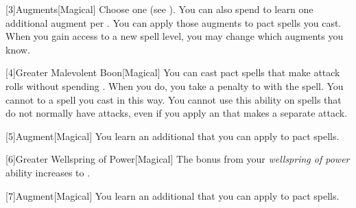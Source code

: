         [3]{Augments}[Magical]
        Choose one  (see ).
        You can also spend  to learn one additional augment per .
        You can apply those augments to pact spells you cast.
        When you gain access to a new spell level, you may change which augments you know.

        [4]{Greater Malevolent Boon}[Magical] You can cast pact spells that make attack rolls without spending .
        When you do, you take a  penalty to  with the spell.
        You cannot  to a spell you cast in this way.
        You cannot use this ability on spells that do not normally have attacks, even if you apply an  that makes a separate attack.

        [5]{Augment}[Magical]
        You learn an additional  that you can apply to pact spells.

        [6]{Greater Wellspring of Power}[Magical]
        The bonus from your \textit{wellspring of power} ability increases to .

        [7]{Augment}[Magical]
        You learn an additional  that you can apply to pact spells.
